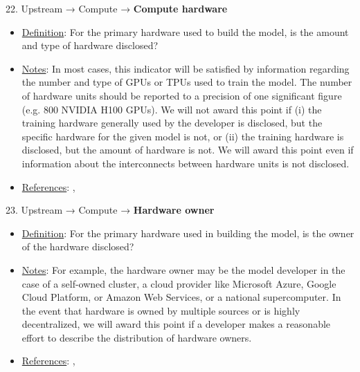22. Upstream → Compute → \textbf{Compute hardware}
\vspace{-\parskip}
\begin{itemize}
	\item
	\underline{Definition}: For the primary hardware used to build the model, is the amount and type of hardware disclosed?
	\item
	\underline{Notes}: In most cases, this indicator will be satisfied by information regarding the number and type of GPUs or TPUs used to train the model. The number of hardware units should be reported to a precision of one significant figure (e.g. 800 NVIDIA H100 GPUs). We will not award this point if (i) the training hardware generally used by the developer is disclosed, but the specific hardware for the given model is not, or (ii) the training hardware is disclosed, but the amount of hardware is not. We will award this point even if information about the interconnects between hardware units is not disclosed.
	\item
	\underline{References}: \citet{sevilla2022compute}, \citet{hoffmann2022training}
\end{itemize} \vspace{\baselineskip}


23. Upstream → Compute → \textbf{Hardware owner}
\vspace{-\parskip}
\begin{itemize}
	\item
	\underline{Definition}: For the primary hardware used in building the model, is the owner of the hardware disclosed?
	\item
	\underline{Notes}: For example, the hardware owner may be the model developer in the case of a self-owned cluster, a cloud provider like Microsoft Azure, Google Cloud Platform, or Amazon Web Services, or a national supercomputer. In the event that hardware is owned by multiple sources or is highly decentralized, we will award this point if a developer makes a reasonable effort to describe the distribution of hardware owners.
	\item
	\underline{References}: \citet{sevilla2022compute}, \citet{hoffmann2022training}
\end{itemize} \vspace{\baselineskip}


